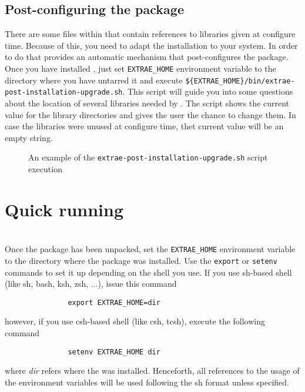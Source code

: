 \subsection{Post-configuring the package}

There are some files within \TRACE that contain references to libraries given at configure time. Because of this, you need to adapt the installation to your system. In order to do that \TRACE provides an automatic mechanism that post-configures the package. Once you have installed \TRACE, just set {\tt EXTRAE\_HOME} environment variable to the directory where you have untarred it and execute {\tt \$\{EXTRAE\_HOME\}/bin/extrae-post-installation-upgrade.sh}. This script will guide you into some questions about the location of several libraries needed by \TRACE. The script shows the current value for the library directories and gives the user the chance to change them. In case the libraries were unused at configure time, thet current value will be an empty string.

\begin{figure}
\centering
\caption{An example of the {\tt extrae-post-installation-upgrade.sh} script execution}
\end{figure}

\section{Quick running}

\\

 Once the package has been unpacked, set the {\tt EXTRAE\_HOME} environment variable to the directory where the package was installed. Use the {\tt export} or {\tt setenv} commands to set it up depending on the shell you use.  If you use sh-based shell (like sh, bash, ksh, zsh, ...), issue this command
\begin{verbatim}
               export EXTRAE_HOME=dir
\end{verbatim}
however, if you use csh-based shell (like csh, tcsh), execute the following command
\begin{verbatim}
               setenv EXTRAE_HOME dir
\end{verbatim}
where {\em dir} refers where the \TRACE was installed. Henceforth, all references to the usage of the environment variables will be used following the sh format unless specified.

